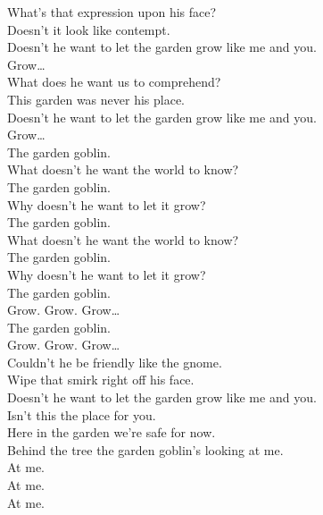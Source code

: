 What's that expression upon his face? \\
Doesn't it look like contempt. \\
Doesn't he want to let the garden grow like me and you. \\

Grow… \\

What does he want us to comprehend? \\
This garden was never his place. \\
Doesn't he want to let the garden grow like me and you. \\

Grow… \\

The garden goblin. \\
What doesn't he want the world to know? \\
The garden goblin. \\
Why doesn't he want to let it grow? \\
The garden goblin. \\
What doesn't he want the world to know? \\
The garden goblin. \\
Why doesn't he want to let it grow? \\
The garden goblin. \\
Grow. Grow. Grow… \\
The garden goblin. \\
Grow. Grow. Grow… \\

Couldn't he be friendly like the gnome. \\
Wipe that smirk right off his face. \\
Doesn't he want to let the garden grow like me and you. \\

Isn't this the place for you. \\
Here in the garden we're safe for now. \\
Behind the tree the garden goblin's looking at me. \\
At me. \\
At me. \\
At me. \\




